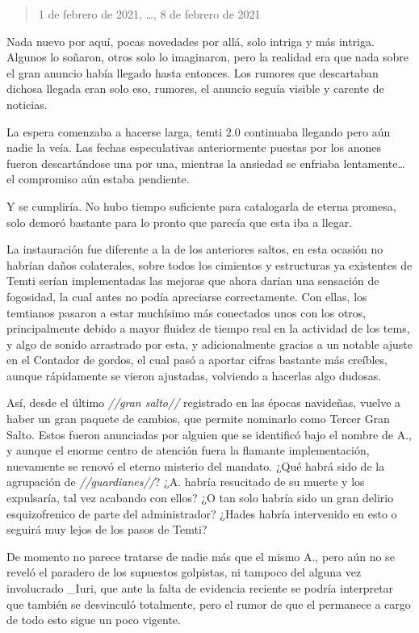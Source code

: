 \documentclass[
  spanish,
]{book}
\begin{document}
\begin{quote}
1 de febrero de 2021, \ldots, 8 de febrero de 2021
\end{quote}

Nada nuevo por aquí, pocas novedades por allá, solo intriga y más intriga. Algunos lo soñaron, otros solo lo imaginaron, pero la realidad era que nada sobre el gran anuncio había llegado hasta entonces. Los rumores que descartaban dichosa llegada eran solo eso, rumores, el anuncio seguía visible y carente de noticias.

La espera comenzaba a hacerse larga, temti 2.0 continuaba llegando pero aún nadie la veía. Las fechas especulativas anteriormente puestas por los anones fueron descartándose una por una, mientras la ansiedad se enfriaba lentamente\ldots{} el compromiso aún estaba pendiente.

Y se cumpliría. No hubo tiempo suficiente para catalogarla de eterna promesa, solo demoró bastante para lo pronto que parecía que esta iba a llegar.

La instauración fue diferente a la de los anteriores saltos, en esta ocasión no habrían daños colaterales, sobre todos los cimientos y estructuras ya existentes de Temti serían implementadas las mejoras que ahora darían una sensación de fogosidad, la cual antes no podía apreciarse correctamente. Con ellas, los temtianos pasaron a estar muchísimo más conectados unos con los otros, principalmente debido a mayor fluidez de tiempo real en la actividad de los tems, y algo de sonido arrastrado por esta, y adicionalmente gracias a un notable ajuste en el Contador de gordos, el cual pasó a aportar cifras bastante más creíbles, aunque rápidamente se vieron ajustadas, volviendo a hacerlas algo dudosas.

Así, desde el último \emph{//gran salto//} registrado en las épocas navideñas, vuelve a haber un gran paquete de cambios, que permite nominarlo como Tercer Gran Salto. Estos fueron anunciadas por alguien que se identificó bajo el nombre de A., y aunque el enorme centro de atención fuera la flamante implementación, nuevamente se renovó el eterno misterio del mandato. ¿Qué habrá sido de la agrupación de \emph{//guardianes//}? ¿A. habría resucitado de su muerte y los expulsaría, tal vez acabando con ellos? ¿O tan solo habría sido un gran delirio esquizofrenico de parte del administrador? ¿Hades habría intervenido en esto o seguirá muy lejos de los pasos de Temti?

De momento no parece tratarse de nadie más que el mismo A., pero aún no se reveló el paradero de los supuestos golpistas, ni tampoco del alguna vez involucrado \_Iuri, que ante la falta de evidencia reciente se podría interpretar que también se desvinculó totalmente, pero el rumor de que el permanece a cargo de todo esto sigue un poco vigente.
\end{document}

